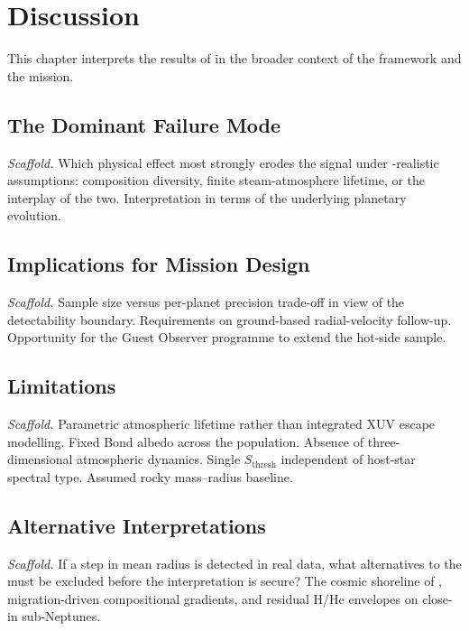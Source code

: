 \chapter{Discussion}
\label{chap:discussion}

This chapter interprets the results of  in the broader
context of the \HZIED framework and the \PLATO mission.


\section{The Dominant Failure Mode}
\label{sec:failure_mode}

\emph{Scaffold.}
Which physical effect most strongly erodes the \HZIED signal under
\PLATO-realistic assumptions: composition diversity, finite steam-atmosphere
lifetime, or the interplay of the two. Interpretation in terms of the
underlying planetary evolution.


\section{Implications for Mission Design}
\label{sec:mission_design}

\emph{Scaffold.}
Sample size versus per-planet precision trade-off in view of the
detectability boundary. Requirements on ground-based radial-velocity
follow-up. Opportunity for the \PLATO Guest Observer programme to extend the
hot-side sample.


\section{Limitations}
\label{sec:limitations}

\emph{Scaffold.}
Parametric atmospheric lifetime rather than integrated XUV escape modelling.
Fixed Bond albedo across the population. Absence of three-dimensional
atmospheric dynamics. Single $S_{\mathrm{thresh}}$ independent of host-star
spectral type. Assumed rocky mass--radius baseline.


\section{Alternative Interpretations}
\label{sec:alternatives}

\emph{Scaffold.}
If a step in mean radius is detected in real \PLATO data, what alternatives
to the \HZIED must be excluded before the interpretation is secure? The
cosmic shoreline of \textcite{OwenWu2017}, migration-driven compositional
gradients, and residual H/He envelopes on close-in sub-Neptunes.
